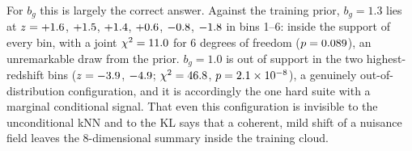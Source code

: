 \documentclass[9pt,twocolumn]{extarticle}
\newcommand{\bg}{b_g}
\begin{document}
For $\bg$ this is largely the correct answer. Against the training prior, $\bg=1.3$ lies at
$z=+1.6$, $+1.5$, $+1.4$, $+0.6$,
$-0.8$, $-1.8$ in bins 1--6: inside the support of every bin, with a
joint $\chi^2=11.0$ for 6 degrees of freedom ($p=0.089$), an
unremarkable draw from the prior. $\bg=1.0$ is out of support in the two highest-redshift bins
($z=-3.9$, $-4.9$; $\chi^2=46.8$,
$p=2.1\times10^{-8}$), a genuinely out-of-distribution configuration, and it is accordingly
the one hard suite with a marginal conditional signal. That even this configuration is invisible to
the unconditional kNN and to the KL says that a coherent, mild shift of a nuisance field leaves the
8-dimensional summary inside the training cloud.
\end{document}
